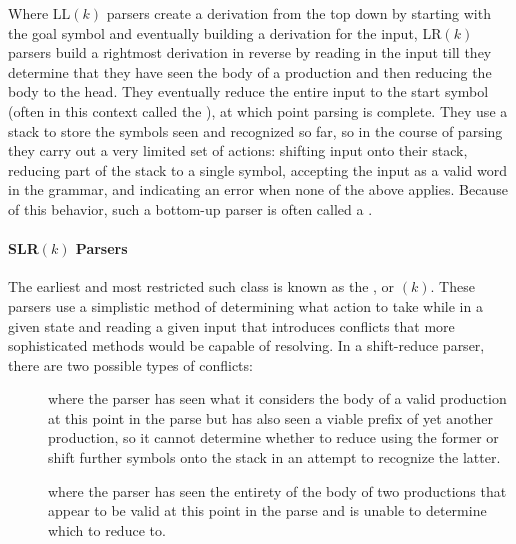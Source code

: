 Where LL$(k)$ parsers create a derivation from the top down by starting with the goal symbol and eventually building a derivation for the input, LR$(k)$ parsers build a rightmost derivation in reverse by reading in the input till they determine that they have seen the body of a production and then reducing the body to the head. They eventually reduce the entire input to the start symbol (often in this context called the ), at which point parsing is complete. They use a stack to store the symbols seen and recognized so far, so in the course of parsing they carry out a very limited set of actions: shifting input onto their stack, reducing part of the stack to a single symbol, accepting the input as a valid word in the grammar, and indicating an error when none of the above applies. Because of this behavior, such a bottom-up parser is often called a .

\paragraph{SLR$(k)$ Parsers}
The earliest and most restricted such class is known as the , or $(k)$. These parsers use a simplistic method of determining what action to take while in a given state and reading a given input that introduces conflicts that more sophisticated methods would be capable of resolving. In a shift-reduce parser, there are two possible types of conflicts: 
\begin{description}
\item[] where the parser has seen what it considers the body of a valid production at this point in the parse but has also seen a viable prefix of yet another production, so it cannot determine whether to reduce using the former or shift further symbols onto the stack in an attempt to recognize the latter.
\item[] where the parser has seen the entirety of the body of two productions that appear to be valid at this point in the parse and is unable to determine which to reduce to.
\end{description}

